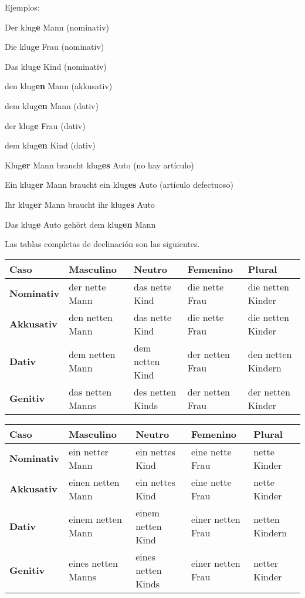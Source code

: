 Ejemplos:
\begin{myitemize}
\item Der klug\textbf{e} Mann (nominativ)
\item Die klug\textbf{e} Frau (nominativ)
\item Das klug\textbf{e} Kind (nominativ)
\item den klug\textbf{en} Mann (akkusativ)
\item dem klug\textbf{en} Mann (dativ)
\item der klug\textbf{e} Frau (dativ)
\item dem klug\textbf{en} Kind (dativ)
\item Klug\textbf{er} Mann braucht klug\textbf{es} Auto (no hay artículo)
\item Ein klug\textbf{er} Mann braucht ein klug\textbf{es} Auto (artículo defectuoso)
\item Ihr klug\textbf{er} Mann braucht ihr klug\textbf{es} Auto
\item Das klug\textbf{e} Auto gehört dem klug\textbf{en} Mann
\end{myitemize}

Las tablas completas de declinación son las siguientes.


\begin{tabular}{| l | l | l | l | l |}
\hline
\textbf{Caso} & \textbf{Masculino} & \textbf{Neutro} & \textbf{Femenino} & \textbf{Plural} \\
\hline
\textbf{Nominativ} & der nette Mann & das nette Kind & die nette Frau & die netten Kinder \\
\textbf{Akkusativ} & den netten Mann & das nette Kind & die nette Frau & die netten Kinder \\
\textbf{Dativ} & dem netten Mann & dem netten Kind & der netten Frau & den netten Kindern \\
\textbf{Genitiv} & das netten Manns & des netten Kinds & der netten Frau & der netten Kinder \\
\hline
\end{tabular}



\begin{tabular}{| l | l | l | l | l |}
\hline
\textbf{Caso} & \textbf{Masculino} & \textbf{Neutro} & \textbf{Femenino} & \textbf{Plural} \\
\hline
\textbf{Nominativ} & ein netter Mann & ein nettes Kind & eine nette Frau &  nette Kinder \\
\textbf{Akkusativ} & einen netten Mann & ein nettes Kind & eine nette Frau & nette Kinder \\
\textbf{Dativ} & einem netten Mann & einem netten Kind & einer netten Frau & netten Kindern \\
\textbf{Genitiv} & eines netten Manns & eines netten Kinds & einer netten Frau & netter Kinder \\
\hline
\end{tabular}



